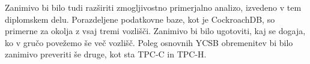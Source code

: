 \documentclass[a4paper, 12pt]{book}
\begin{document}
Zanimivo bi bilo tudi razširiti zmogljivostno primerjalno analizo, izvedeno v tem diplomskem delu. Porazdeljene podatkovne baze, kot je CockroachDB, so primerne za okolja z vsaj tremi vozlišči. Zanimivo bi bilo ugotoviti, kaj se dogaja, ko v gručo povežemo še več vozlišč. Poleg osnovnih YCSB obremenitev bi bilo zanimivo preveriti še druge, kot sta TPC-C in TPC-H.


\newpage %
\ \\
\clearpage
{}


\end{document}
